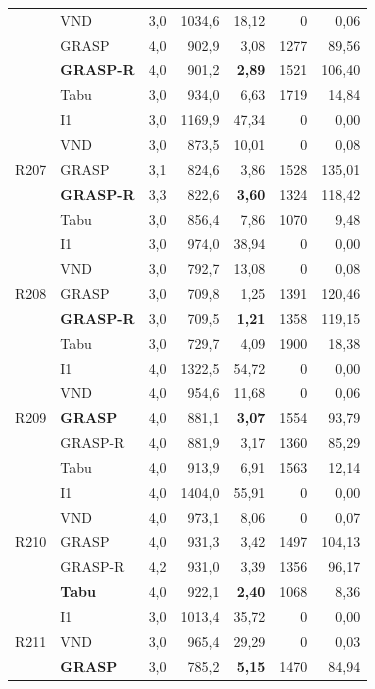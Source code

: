 {\begin{longtable}{llrrrrr}
  & VND & 3,0 & 1034,6 & 18,12 & 0 & 0,06 \\
  & GRASP & 4,0 & 902,9 & 3,08 & 1277 & 89,56 \\
  & \textbf{GRASP-R} & 4,0 & 901,2 & \textbf{2,89} & 1521 & 106,40 \\
  & Tabu & 3,0 & 934,0 & 6,63 & 1719 & 14,84 \\
\midrule
\multirow{5}{*}{R207}
  & I1 & 3,0 & 1169,9 & 47,34 & 0 & 0,00 \\
  & VND & 3,0 & 873,5 & 10,01 & 0 & 0,08 \\
  & GRASP & 3,1 & 824,6 & 3,86 & 1528 & 135,01 \\
  & \textbf{GRASP-R} & 3,3 & 822,6 & \textbf{3,60} & 1324 & 118,42 \\
  & Tabu & 3,0 & 856,4 & 7,86 & 1070 & 9,48 \\
\midrule
\multirow{5}{*}{R208}
  & I1 & 3,0 & 974,0 & 38,94 & 0 & 0,00 \\
  & VND & 3,0 & 792,7 & 13,08 & 0 & 0,08 \\
  & GRASP & 3,0 & 709,8 & 1,25 & 1391 & 120,46 \\
  & \textbf{GRASP-R} & 3,0 & 709,5 & \textbf{1,21} & 1358 & 119,15 \\
  & Tabu & 3,0 & 729,7 & 4,09 & 1900 & 18,38 \\
\midrule
\multirow{5}{*}{R209}
  & I1 & 4,0 & 1322,5 & 54,72 & 0 & 0,00 \\
  & VND & 4,0 & 954,6 & 11,68 & 0 & 0,06 \\
  & \textbf{GRASP} & 4,0 & 881,1 & \textbf{3,07} & 1554 & 93,79 \\
  & GRASP-R & 4,0 & 881,9 & 3,17 & 1360 & 85,29 \\
  & Tabu & 4,0 & 913,9 & 6,91 & 1563 & 12,14 \\
\midrule
\multirow{5}{*}{R210}
  & I1 & 4,0 & 1404,0 & 55,91 & 0 & 0,00 \\
  & VND & 4,0 & 973,1 & 8,06 & 0 & 0,07 \\
  & GRASP & 4,0 & 931,3 & 3,42 & 1497 & 104,13 \\
  & GRASP-R & 4,2 & 931,0 & 3,39 & 1356 & 96,17 \\
  & \textbf{Tabu} & 4,0 & 922,1 & \textbf{2,40} & 1068 & 8,36 \\
\midrule
\multirow{5}{*}{R211}
  & I1 & 3,0 & 1013,4 & 35,72 & 0 & 0,00 \\
  & VND & 3,0 & 965,4 & 29,29 & 0 & 0,03 \\
  & \textbf{GRASP} & 3,0 & 785,2 & \textbf{5,15} & 1470 & 84,94 \\

\end{longtable}}
